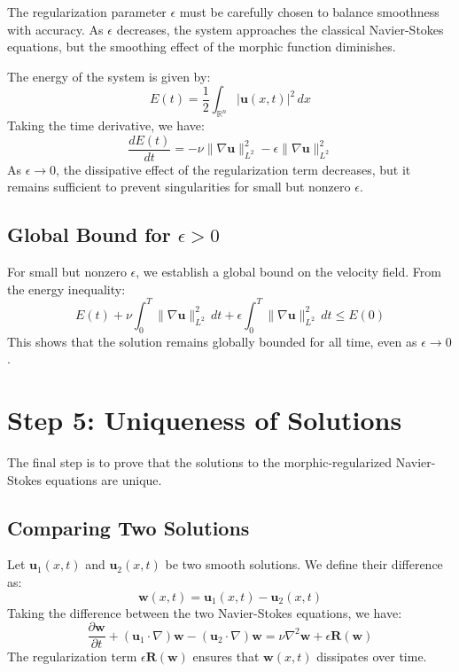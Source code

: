 \documentclass{article}
\begin{document}
\begin{itemize}
The regularization parameter \( \epsilon \) must be carefully chosen to balance smoothness with accuracy. As \( \epsilon \) decreases, the system approaches the classical Navier-Stokes equations, but the smoothing effect of the morphic function diminishes.

The energy of the system is given by:
\[
E(t) = \frac{1}{2} \int_{\mathbb{R}^n} |\mathbf{u}(x,t)|^2 \, dx
\]
Taking the time derivative, we have:
\[
\frac{dE(t)}{dt} = - \nu \|\nabla \mathbf{u}\|_{L^2}^2 - \epsilon \|\nabla \mathbf{u}\|_{L^2}^2
\]
As \( \epsilon \to 0 \), the dissipative effect of the regularization term decreases, but it remains sufficient to prevent singularities for small but nonzero \( \epsilon \).

\subsection*{Global Bound for \(\epsilon > 0\)}

For small but nonzero \( \epsilon \), we establish a global bound on the velocity field. From the energy inequality:
\[
E(t) + \nu \int_0^T \|\nabla \mathbf{u}\|_{L^2}^2 \, dt + \epsilon \int_0^T \|\nabla \mathbf{u}\|_{L^2}^2 \, dt \leq E(0)
\]
This shows that the solution remains globally bounded for all time, even as \( \epsilon \to 0 \).

\section*{Step 5: Uniqueness of Solutions}

The final step is to prove that the solutions to the morphic-regularized Navier-Stokes equations are unique.

\subsection*{Comparing Two Solutions}

Let \( \mathbf{u}_1(x,t) \) and \( \mathbf{u}_2(x,t) \) be two smooth solutions. We define their difference as:
\[
\mathbf{w}(x,t) = \mathbf{u}_1(x,t) - \mathbf{u}_2(x,t)
\]
Taking the difference between the two Navier-Stokes equations, we have:
\[
\frac{\partial \mathbf{w}}{\partial t} + (\mathbf{u}_1 \cdot \nabla) \mathbf{w} - (\mathbf{u}_2 \cdot \nabla) \mathbf{w} = \nu \nabla^2 \mathbf{w} + \epsilon \mathbf{R}(\mathbf{w})
\]
The regularization term \( \epsilon \mathbf{R}(\mathbf{w}) \) ensures that \( \mathbf{w}(x,t) \) dissipates over time.


\end{itemize}
\end{document}
